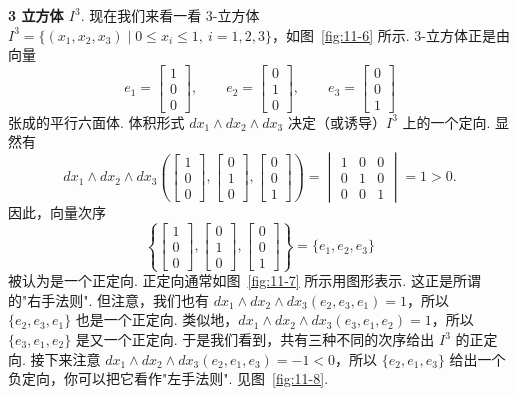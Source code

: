 \textbf{3 立方体 $I^3$}. 现在我们来看一看 3-立方体 $I^3=\{(x_1,x_2,x_3)\mid 0\leq x_i\leq 1,\ i=1,2,3\}$，如图~\ref{fig:11-6} 所示. 3-立方体正是由向量
\[
e_1=\begin{bmatrix}1\\0\\0\end{bmatrix},\qquad e_2=\begin{bmatrix}0\\1\\0\end{bmatrix},\qquad e_3=\begin{bmatrix}0\\0\\1\end{bmatrix}
\]
张成的平行六面体. 体积形式 $dx_1\wedge dx_2\wedge dx_3$ 决定（或诱导）$I^3$ 上的一个定向. 显然有
\[
dx_1\wedge dx_2\wedge dx_3\left(\begin{bmatrix}1\\0\\0\end{bmatrix},\begin{bmatrix}0\\1\\0\end{bmatrix},\begin{bmatrix}0\\0\\1\end{bmatrix}\right)=\begin{vmatrix}1&0&0\\0&1&0\\0&0&1\end{vmatrix}=1>0.
\]
因此，向量次序
\[
\left\{\begin{bmatrix}1\\0\\0\end{bmatrix},\begin{bmatrix}0\\1\\0\end{bmatrix},\begin{bmatrix}0\\0\\1\end{bmatrix}\right\}=\{e_1,e_2,e_3\}
\]
被认为是一个正定向. 正定向通常如图~\ref{fig:11-7} 所示用图形表示. 这正是所谓的"右手法则". 但注意，我们也有 $dx_1\wedge dx_2\wedge dx_3(e_2,e_3,e_1)=1$，所以 $\{e_2,e_3,e_1\}$ 也是一个正定向. 类似地，$dx_1\wedge dx_2\wedge dx_3(e_3,e_1,e_2)=1$，所以 $\{e_3,e_1,e_2\}$ 是又一个正定向. 于是我们看到，共有三种不同的次序给出 $I^3$ 的正定向. 接下来注意 $dx_1\wedge dx_2\wedge dx_3(e_2,e_1,e_3)=-1<0$，所以 $\{e_2,e_1,e_3\}$ 给出一个负定向，你可以把它看作"左手法则". 见图~\ref{fig:11-8}.

